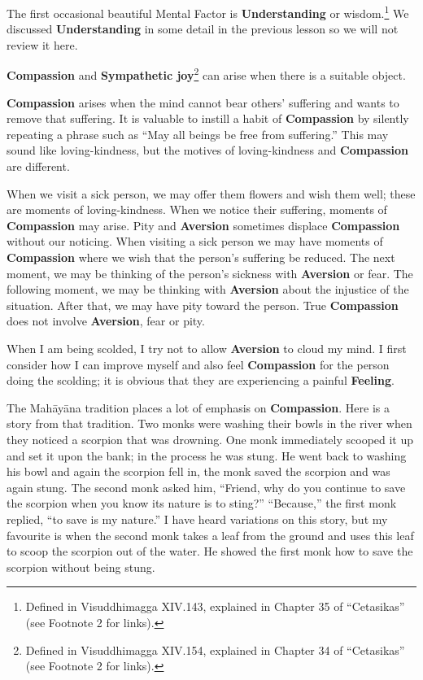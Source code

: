 The first occasional beautiful Mental Factor is \textbf{Understanding} or wisdom.\footnote{Defined in Visuddhimagga XIV.143, explained in Chapter 35 of “Cetasikas” (see Footnote 2 for links).} We discussed \textbf{Understanding} in some detail in the previous lesson so we will not review it here.

\textbf{Compassion} and \textbf{Sympathetic joy}\footnote{Defined in Visuddhimagga XIV.154, explained in Chapter 34 of “Cetasikas” (see Footnote 2 for links).} can arise when there is a suitable object.

\textbf{Compassion} arises when the mind cannot bear others’ suffering and wants to remove that suffering. It is valuable to instill a habit of \textbf{Compassion} by silently repeating a phrase such as “May all beings be free from suffering.” This may sound like loving-kindness, but the motives of loving-kindness and \textbf{Compassion} are different.

When we visit a sick person, we may offer them flowers and wish them well; these are moments of loving-kindness. When we notice their suffering, moments of \textbf{Compassion} may arise. Pity and \textbf{Aversion} sometimes displace \textbf{Compassion} without our noticing. When visiting a sick person we may have moments of \textbf{Compassion} where we wish that the person’s suffering be reduced. The next moment, we may be thinking of the person’s sickness with \textbf{Aversion} or fear. The following moment, we may be thinking with \textbf{Aversion} about the injustice of the situation. After that, we may have pity toward the person. True \textbf{Compassion} does not involve \textbf{Aversion}, fear or pity.

\pagebreak

When I am being scolded, I try not to allow \textbf{Aversion} to cloud my mind. I first consider how I can improve myself and also feel \textbf{Compassion} for the person doing the scolding; it is obvious that they are experiencing a painful \textbf{Feeling}.

The Mahāyāna tradition places a lot of emphasis on \textbf{Compassion}. Here is a story from that tradition. Two monks were washing their bowls in the river when they noticed a scorpion that was drowning. One monk immediately scooped it up and set it upon the bank; in the process he was stung. He went back to washing his bowl and again the scorpion fell in, the monk saved the scorpion and was again stung. The second monk asked him, “Friend, why do you continue to save the scorpion when you know its nature is to sting?” “Because,” the first monk replied, “to save is my nature.” I have heard variations on this story, but my favourite is when the second monk takes a leaf from the ground and uses this leaf to scoop the scorpion out of the water. He showed the first monk how to save the scorpion without being stung.

